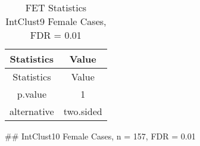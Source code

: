 \documentclass[]{article}
\begin{document}
\begin{longtable}[]{@{}cc@{}}
\caption{FET Statistics IntClust9 Female Cases, FDR =
0.01}\tabularnewline
\toprule
\begin{minipage}[b]{0.18\columnwidth}\centering\strut
Statistics\strut
\end{minipage} & \begin{minipage}[b]{0.14\columnwidth}\centering\strut
Value\strut
\end{minipage}\tabularnewline
\midrule
\endfirsthead
\toprule
\begin{minipage}[b]{0.18\columnwidth}\centering\strut
Statistics\strut
\end{minipage} & \begin{minipage}[b]{0.14\columnwidth}\centering\strut
Value\strut
\end{minipage}\tabularnewline
\midrule
\endhead
\begin{minipage}[t]{0.18\columnwidth}\centering\strut
p.value\strut
\end{minipage} & \begin{minipage}[t]{0.14\columnwidth}\centering\strut
1\strut
\end{minipage}\tabularnewline
\begin{minipage}[t]{0.18\columnwidth}\centering\strut
alternative\strut
\end{minipage} & \begin{minipage}[t]{0.14\columnwidth}\centering\strut
two.sided\strut
\end{minipage}\tabularnewline
\bottomrule
\end{longtable}

\pagebreak
\#\# IntClust10 Female Cases, n = 157, FDR = 0.01
\end{document}
